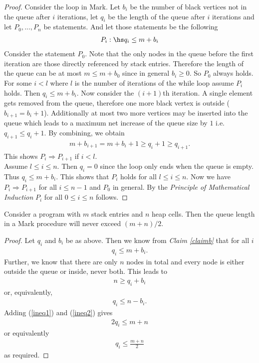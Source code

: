 \documentclass{article}
\begin{document}
\begin{proof}
	Consider the loop in Mark.
	Let $b_i$ be the number of black vertices not in the queue after $i$ iterations,
	let $q_i$ be the length of the queue after $i$ iterations and
	let $P_0,...,P_n$ be statements. And let those statements be
	the following
	\begin{align*}
		P_i:\hs q_i \leq m+b_i
	\end{align*}
	Consider the statement $P_0$. Note that the only nodes in the queue before
	the first iteration are those directly referenced by stack entries. Therefore
	the length of the queue can be at most $m\leq m+b_0$ since in general $b_i\geq 0$.
	So $P_0$ always holds.\\
	\indent For some $i<l$ where $l$ is the number of iterations of the while loop
	assume $P_i$ holds. Then $q_i\leq m+b_i$. Now consider the
	$(i+1)$th iteration. A single element gets removed from the queue, therefore
	one more black vertex is outside ($b_{i+1}= b_i + 1$). Additionally
	at most two more vertices may be inserted into the queue which leads to a
	maximum net increase of the queue size by $1$ i.e. $q_{i+1}\leq q_i + 1$.
	By combining, we obtain
	\begin{align*}
		m + b_{i+1} = m + b_{i} + 1 \geq q_{i} + 1 \geq q_{i+1}.
	\end{align*}
	This shows $P_i\Rightarrow P_{i+1}$ if $i<l$.\\
	\indent Assume $l\leq i \leq n$. Then $q_i = 0$ since the loop only ends
	when the queue is empty. Thus $q_i \leq m + b_i$. This shows that
	$P_i$ holds for all $l\leq i\leq n$.
	Now we have $P_i\Rightarrow P_{i+1}$ for all $i\leq n-1$ and $P_0$ in
	general. By the \emph{Principle of Mathematical Induction}
	$P_i$ for all $0\leq i\leq n$ follows.
\end{proof}

\begin{claim}
	Consider a program with $m$ stack entries and $n$ heap cells.
	Then the queue length in a Mark procedure will never exceed $(m+n)/2$.
\end{claim}

\begin{proof}
	Let $q_i$ and $b_i$ be as above. Then we know from \emph{Claim \ref{claimb}}
	that for all $i$
	\begin{align}
		\label{ineq1}
		q_i \leq m + b_i.
	\end{align}
	Further, we know that there are only $n$ nodes in total and every node
	is either outside the queue or inside, never both. This leads to
	\begin{align*}
		n \geq q_i + b_i
	\end{align*}
	or, equivalently,
	\begin{align}
		\label{ineq2}
		q_i \leq n-b_i.
	\end{align}
	Adding (\ref{ineq1}) and (\ref{ineq2}) gives
	\begin{align*}
		2q_i \leq m + n
	\end{align*}
	or equivalently
	\begin{align*}
		q_i \leq \frac{m+n}{2}
	\end{align*}
	as required.
\end{proof}
\end{document}
